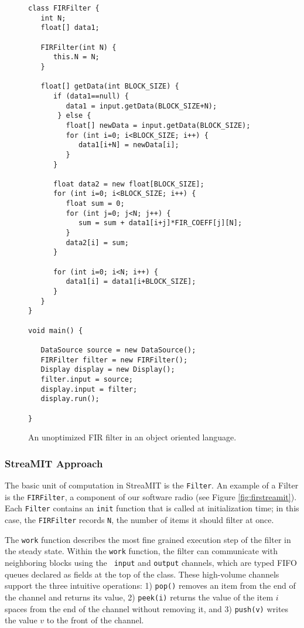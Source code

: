 \begin{figure}
\scriptsize
\begin{verbatim}
class FIRFilter {
   int N;
   float[] data1;

   FIRFilter(int N) {
      this.N = N;
   }

   float[] getData(int BLOCK_SIZE) {
      if (data1==null) {
         data1 = input.getData(BLOCK_SIZE+N);
       } else {
         float[] newData = input.getData(BLOCK_SIZE);
         for (int i=0; i<BLOCK_SIZE; i++) {
            data1[i+N] = newData[i];
         }
      }

      float data2 = new float[BLOCK_SIZE];
      for (int i=0; i<BLOCK_SIZE; i++) {
         float sum = 0;
         for (int j=0; j<N; j++) {
            sum = sum + data1[i+j]*FIR_COEFF[j][N];
         }
         data2[i] = sum;
      }

      for (int i=0; i<N; i++) {
         data1[i] = data1[i+BLOCK_SIZE];
      }
   }
}

void main() {

   DataSource source = new DataSource();
   FIRFilter filter = new FIRFilter();
   Display display = new Display();
   filter.input = source;
   display.input = filter;
   display.run();

}
\end{verbatim}
\vspace{-12pt}
\caption{\protect\small An unoptimized FIR filter in an object oriented language.
\protect\label{fig:firobject}}
\vspace{-12pt}
\end{figure}

\subsubsection{StreaMIT Approach}

The basic unit of computation in StreaMIT is the {\tt Filter}.  An
example of a Filter is the {\tt FIRFilter}, a component of our
software radio (see Figure \ref{fig:firstreamit}).  Each {\tt Filter}
contains an {\tt init} function that is called at initialization time;
in this case, the {\tt FIRFilter} records {\tt N}, the number of items
it should filter at once.

The {\tt work} function describes the most fine grained execution step
of the filter in the steady state.  Within the {\tt work} function,
the filter can communicate with neighboring blocks using the {\tt
input} and {\tt output} channels, which are typed FIFO queues declared
as fields at the top of the class.  These high-volume channels support
the three intuitive operations: 1) {\tt pop()} removes an item from the
end of the channel and returns its value, 2) {\tt peek(i)} returns the
value of the item $i$ spaces from the end of the channel without
removing it, and 3) {\tt push(v)} writes the value $v$ to the front of
the channel.  

